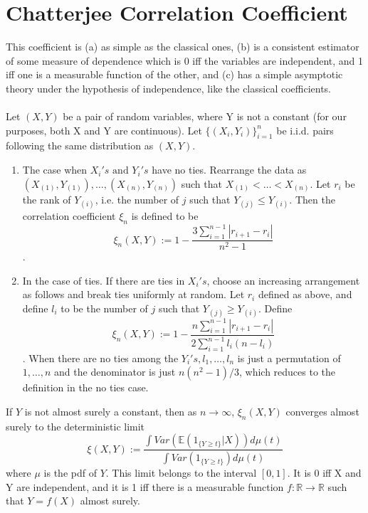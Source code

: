 \section{Chatterjee Correlation Coefficient}
This coefficient is (a) as simple as the classical ones, (b) is a consistent estimator of some measure of dependence which is 0 iff the variables are independent, and 1 iff one is a measurable function of the other, and (c) has a simple asymptotic theory under the hypothesis of independence, like the classical coefficients. \\\\
Let $(X, Y)$ be a pair of random variables, where Y is not a constant (for our purposes, both X and Y are continuous). Let $\{(X_i, Y_i)\}_{i = 1}^{n}$ be i.i.d. pairs following the same distribution as $(X, Y)$.
\begin{enumerate}
    \item The case when $X_i's \text{ and } Y_i's$ have no ties. Rearrange the data as $(X_{(1)}, Y_{(1)}), \dots, (X_{(n)}, Y_{(n)})$ such that $X_{(1)} < \dots < X_{(n)}$. Let $r_i$ be the rank of $Y_{(i)}$, i.e. the number of $j$ such that $Y_{(j)} \leq Y_{(i)}$.  Then the correlation coefficient $\xi_n$ is defined to be
    $$\xi_n(X, Y) := 1-\frac{3\sum_{i=1}^{n-1} |r_{i+1} - r_i|}{n^2-1}$$.
    
    \item In the case of ties. If there are ties in $X_i's$, choose an increasing arrangement as follows and break ties uniformly at random. Let $r_i$ defined as above, and define $l_i$ to be the number of $j$ such that $Y_{(j)} \geq Y_{(i)}$. Define 
    $$\xi_n(X, Y) := 1-\frac{n\sum_{i=1}^{n-1} |r_{i+1} - r_i|}{2\sum_{i=1}^{n-1}l_i(n-l_i)}$$.
    When there are no ties among the $Y_i's, l_1, \dots, l_n$ is just a permutation of $1, \dots, n$ and the denominator is just $n(n^2-1)/3$, which reduces to the definition in the no ties case.
\end{enumerate}

\begin{theorem}
If $Y$ is not almost surely a constant, then as $n \rightarrow \infty$, $\xi_n(X, Y)$ converges almost surely to the deterministic limit 
$$\xi(X, Y) := \frac{\int Var(\mathbb{E}(1_{\{Y \geq t\}}|X)) d\mu(t)}{\int Var(1_{\{Y \geq t\}}) d\mu(t)}$$
where $\mu$ is the pdf of $Y$. This limit belongs to the interval $[0, 1]$. It is 0 iff X and Y are independent, and it is 1 iff there is a measurable function $f:\mathbb{R} \rightarrow \mathbb{R}$ such that $Y = f(X)$ almost surely.
\end{theorem}
